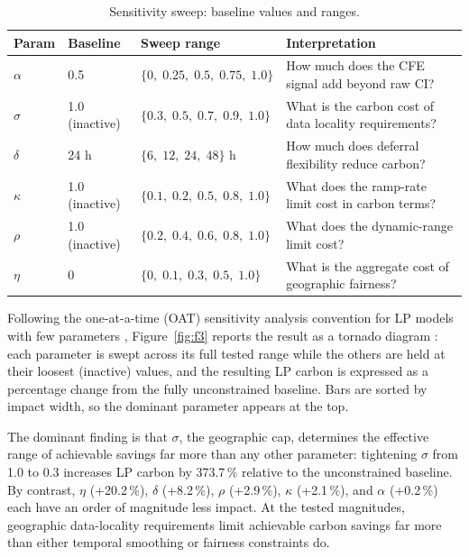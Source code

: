 \documentclass[11pt, a4paper]{article}
\begin{document}
\begin{table}[h]
\centering\small
\renewcommand{\arraystretch}{1.3}
\begin{tabularx}{\linewidth}{llp{4.0cm}X}
\toprule
\textbf{Param} & \textbf{Baseline} & \textbf{Sweep range} & \textbf{Interpretation} \\
\midrule
$\alpha$ & 0.5 & $\{0,\;0.25,\;0.5,\;0.75,\;1.0\}$ & How much does the CFE signal add beyond raw CI? \\
$\sigma$ & 1.0 (inactive) & $\{0.3,\;0.5,\;0.7,\;0.9,\;1.0\}$ & What is the carbon cost of data locality requirements? \\
$\delta$ & 24 h & $\{6,\;12,\;24,\;48\}$ h & How much does deferral flexibility reduce carbon? \\
$\kappa$ & 1.0 (inactive) & $\{0.1,\;0.2,\;0.5,\;0.8,\;1.0\}$ & What does the ramp-rate limit cost in carbon terms? \\
$\rho$   & 1.0 (inactive) & $\{0.2,\;0.4,\;0.6,\;0.8,\;1.0\}$ & What does the dynamic-range limit cost? \\
$\eta$   & 0 & $\{0,\;0.1,\;0.3,\;0.5,\;1.0\}$ & What is the aggregate cost of geographic fairness? \\
\bottomrule
\end{tabularx}
\caption{Sensitivity sweep: baseline values and ranges. \label{tab:baseline}}
\end{table}

Following the one-at-a-time (OAT) sensitivity analysis convention for LP models with few parameters \citep{saltelli2008}, Figure~\ref{fig:f3} reports the result as a tornado diagram \citep{eschenbach1992}: each parameter is swept across its full tested range while the others are held at their loosest (inactive) values, and the resulting LP carbon is expressed as a percentage change from the fully unconstrained baseline. Bars are sorted by impact width, so the dominant parameter appears at the top.

The dominant finding is that $\sigma$, the geographic cap, determines the effective range of achievable savings far more than any other parameter: tightening $\sigma$ from 1.0 to 0.3 increases LP carbon by 373.7\,\% relative to the unconstrained baseline. By contrast, $\eta$ (+20.2\,\%), $\delta$ (+8.2\,\%), $\rho$ (+2.9\,\%), $\kappa$ (+2.1\,\%), and $\alpha$ (+0.2\,\%) each have an order of magnitude less impact. At the tested magnitudes, geographic data-locality requirements limit achievable carbon savings far more than either temporal smoothing or fairness constraints do.
\end{document}
